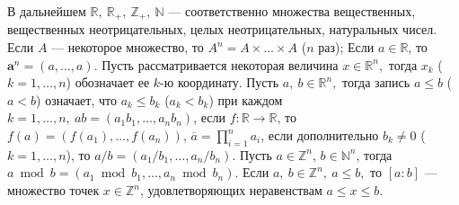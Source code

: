 


В дальнейшем $\mathbb{R},\ 
\mathbb{R}_+,
\ \mathbb{Z}_+,
\ \mathbb{N}$ ---
соответственно множества вещественных, 
вещественных неотрицательных, 
целых неотрицательных, натуральных
чисел.
Если $A$ --- некоторое множество, то $A^n=A\times\ldots \times A$ ($n$ раз);
Если $a\in\mathbb{R}$, то $\mathbf{a}^n=(a,\ldots,a)$.
Пусть рассматривается некоторая величина $x\in\mathbb{R}^n,$ тогда
$x_k$ ($k=1,\ldots,n$) обозначает ее $k$-ю координату. 
Пусть $a,\ b \in \mathbb{R}^n,$ тогда запись $a\leqslant b$ ($a<b$) означает, что 
$a_k\leqslant b_k$ ($a_k<b_k$) при каждом $k=1,\ldots,n,\ ab=(a_1b_1,\ldots,a_n b_n)$,
если
$f\colon\mathbb{R}\to\mathbb{R}$,
то $f(a)=(f(a_1),\ldots,f(a_n))$,
$\overline{a}=\prod_{i=1}^n a_i$, 
если дополнительно $b_k\neq 0$ ($k=1,\ldots, n$), то $a/b=(a_1/b_1,\ldots,a_n/ b_n)$.  
Пусть $a\in \mathbb{Z}^n$, $b\in \mathbb{N}^n$, тогда $a \bmod b =(a_1 \bmod b_1,\ldots,a_n \bmod b_n)$.
Если $a,\ b \in \mathbb{Z}^n,\ a\leqslant b,$ то $[a:b]$ --- множество точек
$x\in \mathbb{Z}^n$, удовлетворяющих неравенствам $a\leqslant x \leqslant b$.

